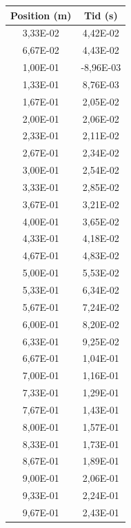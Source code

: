 \documentclass[11p, titlepage, oneside, a4paper]{article}
\begin{document}
        \begin{table}
            \begin{center}
            \begin{tabular}{ |c|c| }
                \hline
                Position (m) & Tid (s)  \\
                \hline
                3,33E-02 & 4,42E-02 \\
                6,67E-02 & 4,43E-02 \\
                1,00E-01 & -8,96E-03 \\
                1,33E-01 & 8,76E-03 \\
                1,67E-01 & 2,05E-02 \\
                2,00E-01 & 2,06E-02 \\
                2,33E-01 & 2,11E-02 \\
                2,67E-01 & 2,34E-02 \\
                3,00E-01 & 2,54E-02 \\
                3,33E-01 & 2,85E-02 \\
                3,67E-01 & 3,21E-02 \\
                4,00E-01 & 3,65E-02 \\
                4,33E-01 & 4,18E-02 \\
                4,67E-01 & 4,83E-02 \\
                5,00E-01 & 5,53E-02 \\
                5,33E-01 & 6,34E-02 \\
                5,67E-01 & 7,24E-02 \\
                6,00E-01 & 8,20E-02 \\
                6,33E-01 & 9,25E-02 \\
                6,67E-01 & 1,04E-01 \\
                7,00E-01 & 1,16E-01 \\
                7,33E-01 & 1,29E-01 \\
                7,67E-01 & 1,43E-01 \\
                8,00E-01 & 1,57E-01 \\
                8,33E-01 & 1,73E-01 \\
                8,67E-01 & 1,89E-01 \\
                9,00E-01 & 2,06E-01 \\
                9,33E-01 & 2,24E-01 \\
                9,67E-01 & 2,43E-01 \\

\end{tabular}
\end{center}
\end{table}
\end{document}
